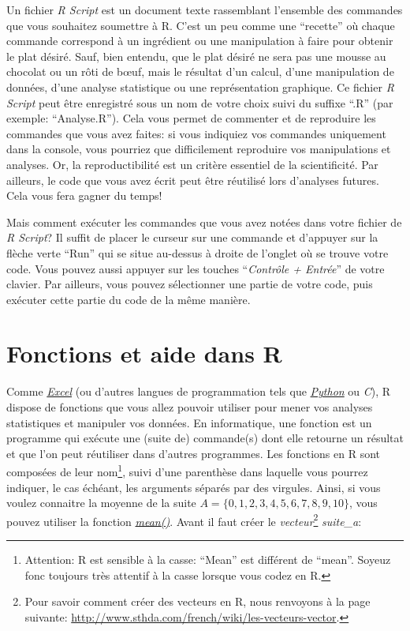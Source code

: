 \documentclass[
]{book}
\begin{document}
Un fichier \emph{R Script} est un document texte rassemblant l'ensemble des commandes que vous souhaitez soumettre à R. C'est un peu comme une ``recette'' où chaque commande correspond à un ingrédient ou une manipulation à faire pour obtenir le plat désiré. Sauf, bien entendu, que le plat désiré ne sera pas une mousse au chocolat ou un rôti de bœuf, mais le résultat d'un calcul, d'une manipulation de données, d'une analyse statistique ou une représentation graphique. Ce fichier \emph{R Script} peut être enregistré sous un nom de votre choix suivi du suffixe ``.R'' (par exemple: ``Analyse.R''). Cela vous permet de commenter et de reproduire les commandes que vous avez faites: si vous indiquiez vos commandes uniquement dans la console, vous pourriez que difficilement reproduire vos manipulations et analyses. Or, la reproductibilité est un critère essentiel de la scientificité. Par ailleurs, le code que vous avez écrit peut être réutilisé lors d'analyses futures. Cela vous fera gagner du temps!

Mais comment exécuter les commandes que vous avez notées dans votre fichier de \emph{R Script}? Il suffit de placer le curseur sur une commande et d'appuyer sur la flèche verte ``Run'' qui se situe au-dessus à droite de l'onglet où se trouve votre code. Vous pouvez aussi appuyer sur les touches ``\emph{Contrôle + Entrée}'' de votre clavier. Par ailleurs, vous pouvez sélectionner une partie de votre code, puis exécuter cette partie du code de la même manière.

\hypertarget{Fonctions_aides}{%
\section{Fonctions et aide dans R}\label{Fonctions_aides}}

Comme \href{https://www.microsoft.com/fr-be/microsoft-365/excel}{\emph{Excel}} (ou d'autres langues de programmation tels que \href{https://www.python.org/}{\emph{Python}} ou \emph{C}), R dispose de fonctions que vous allez pouvoir utiliser pour mener vos analyses statistiques et manipuler vos données. En informatique, une fonction est un programme qui exécute une (suite de) commande(s) dont elle retourne un résultat et que l'on peut réutiliser dans d'autres programmes. Les fonctions en R sont composées de leur nom\footnote{Attention: R est sensible à la casse: ``Mean'' est différent de ``mean''. Soyeuz fonc toujours très attentif à la casse lorsque vous codez en R.}, suivi d'une parenthèse dans laquelle vous pourrez indiquer, le cas échéant, les arguments séparés par des virgules. Ainsi, si vous voulez connaitre la moyenne de la suite \(A=\{0,1,2,3,4,5,6,7,8,9,10\}\), vous pouvez utiliser la fonction \href{https://www.rdocumentation.org/packages/base/versions/3.6.2/topics/mean}{\emph{mean()}}. Avant il faut créer le \emph{vecteur}\footnote{Pour savoir comment créer des vecteurs en R, nous renvoyons à la page suivante: \url{http://www.sthda.com/french/wiki/les-vecteurs-vector}.} \emph{suite\_a}:
\end{document}
